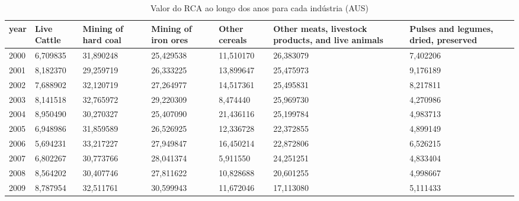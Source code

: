 \begin{table}
\centering
\caption{Valor do RCA ao longo dos anos para cada indústria (AUS)}
\begin{tabular}{p{1cm}p{2cm}p{2cm}p{2cm}p{2cm}p{2cm}p{2cm}}
\toprule
 year &  Live Cattle &  Mining of hard coal &  Mining of iron ores &  Other cereals &  Other meats, livestock products, and live animals &  Pulses and legumes, dried, preserved \\
\midrule
 2000 &     6,709835 &            31,890248 &            25,429538 &      11,510170 &                                          26,383079 &                              7,402206 \\
 2001 &     8,182370 &            29,259719 &            26,333225 &      13,899647 &                                          25,475973 &                              9,176189 \\
 2002 &     7,688902 &            32,120719 &            27,264977 &      14,517361 &                                          25,495831 &                              8,217811 \\
 2003 &     8,141518 &            32,765972 &            29,220309 &       8,474440 &                                          25,969730 &                              4,270986 \\
 2004 &     8,950490 &            30,270327 &            25,407090 &      21,436116 &                                          25,199784 &                              4,983713 \\
 2005 &     6,948986 &            31,859589 &            26,526925 &      12,336728 &                                          22,372855 &                              4,899149 \\
 2006 &     5,694231 &            33,217227 &            27,949847 &      16,450214 &                                          22,872806 &                              6,526215 \\
 2007 &     6,802267 &            30,773766 &            28,041374 &       5,911550 &                                          24,251251 &                              4,833404 \\
 2008 &     8,564202 &            30,407746 &            27,811622 &      10,828688 &                                          20,601255 &                              4,998667 \\
 2009 &     8,787954 &            32,511761 &            30,599943 &      11,672046 &                                          17,113080 &                              5,111433 \\

\end{tabular}
\end{table}
